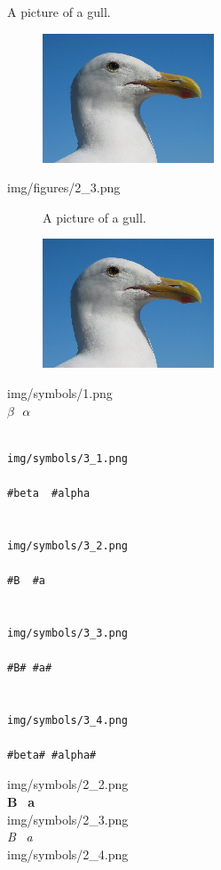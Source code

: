 \documentclass[14pt]{article}
\begin{document}
A picture of a gull.
\begin{figure}[H]
\includegraphics[scale=1]{../../img/gull.png}
\end{figure}
\newpage
\noindent
img/figures/2\_3.png\\[.5cm]
\begin{figure}[H]
\begin{center}
\fontsize{14}{14}\selectfont
A picture of a gull.\\
\setlength{\itemsep}{12pt}
\setlength{\parskip}{12pt}
\setlength{\parsep}{12pt}

\includegraphics[scale=1]{../../img/gull.png}
\end{center}
\end{figure}
\noindent
img/symbols/1.png\\[.5cm]
$\beta\ \ \  \alpha$
\begin{verbatim}

img/symbols/3_1.png

#beta  #alpha


img/symbols/3_2.png

#B  #a


img/symbols/3_3.png

#B# #a#


img/symbols/3_4.png

#beta# #alpha#

\end{verbatim}
\noindent
img/symbols/2\_2.png\\[.5cm]
\textbf{B} \ \textbf{a}\\[.5cm]
img/symbols/2\_3.png\\[.5cm]
\textit{B} \ \textit{a}\\[.5cm]
img/symbols/2\_4.png\\[.5cm]
\end{document}
